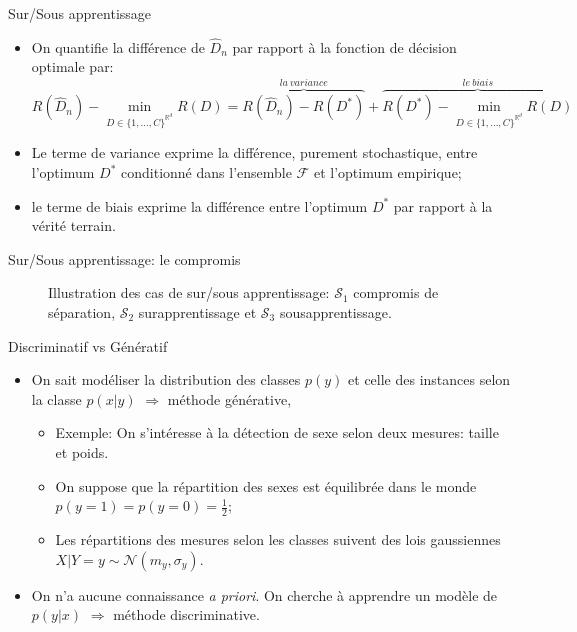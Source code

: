 \documentclass[8pt]{beamer}
\begin{document}
			\begin{frame}{Sur/Sous apprentissage}
				\begin{itemize}
					\item<1-> On quantifie la différence de \(\widehat D_n \) par rapport à la fonction de décision optimale par:
						\begin{equation}
							R(\widehat D_n) - \min_{D \in \{1, \dots, C\}^{\mathbb{R}^d}} R(D) = \overbrace{R(\widehat D_n) - R(D^*)}^{la\ variance} + \overbrace{R(D^*) - \min_{D \in \{1, \dots, C\}^{\mathbb{R}^d}} R(D)}^{le\ biais}
						\end{equation}
					\item<2-> Le terme de variance exprime la différence, purement stochastique, entre l'optimum \(D^*\) conditionné dans l'ensemble \(\mathscr{F}\) et l'optimum empirique;
					\item<3-> le terme de biais exprime la différence entre l'optimum \(D^*\) par rapport à la vérité terrain.
				\end{itemize}
			\end{frame}
			\begin{frame}[plain]{Sur/Sous apprentissage: le compromis}
				\begin{figure}[H]
					\begin{center}
						
						\vspace{-1em}
						\caption*{Illustration des cas de sur/sous apprentissage: $\mathscr{S}_1$ compromis de séparation, $\mathscr{S}_2$ surapprentissage et $\mathscr{S}_3$ sousapprentissage.}	
					\end{center}
				\end{figure}
			\end{frame}
			\begin{frame}{Discriminatif vs Génératif}
				\begin{itemize}
					\item<1-> On sait modéliser la distribution des classes $p(y)$ et celle des instances selon la classe $p(x\vert y)$ $\Longrightarrow$ méthode générative,
						\begin{itemize}
							\item<2-> Exemple: On s'intéresse à la détection de sexe selon deux mesures: taille et poids.
							\item<3-> On suppose que la répartition des sexes est équilibrée dans le monde $p(y=1) = p(y=0) = \frac{1}{2}$;
							\item<4-> Les répartitions des mesures selon les classes suivent des lois gaussiennes $X\vert Y=y \sim \mathscr{N}(m_y, \sigma_y)$.
						\end{itemize}
					\item<5-> On n'a aucune connaissance \textit{a priori}. On cherche à apprendre un modèle de $p(y \vert x)$ $\Longrightarrow$ méthode discriminative.
				\end{itemize}
			\end{frame}
\end{document}
